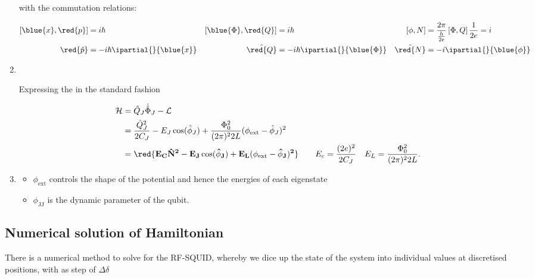 \begin{enumerate}
  \noindent with the commutation relations:

  \begin{align}
    \left[\blue{x},\red{p}\right] & =i\hbar & \left[\blue{\Phi},\red{Q}\right] & = i\hbar & \left[\phi,N\right] & = \frac{2\pi}{\frac{h}{2e}}\left[\Phi,Q\right]\frac{1}{2e} = i\\
    \red{\hat{p}} & = -i\hbar\ipartial{}{\blue{x}} & \hat{\red{Q}} & =-i\hbar\ipartial{}{\blue{\Phi}} & \hat{\red{N}} & =-i\ipartial{}{\blue{\phi}}
  \end{align}

\item\

\begin{framed}\noindent
  Expressing the  in the standard fashion

  \begin{equation}
    \begin{aligned}
      \mathcal{H} & = \hat{Q}_J\dot{\hat{\Phi}}_J - \mathcal{L}\\
      & = \frac{\hat{Q}_J^2}{2C_J} - E_J\cos(\hat{\phi}_J) + \frac{\Phi_0^2}{(2\pi)^22L}(\phi_\text{ext}-\hat{\phi}_J)^2\\
      &    =   \mathbf{\red{E_C{\hat{N}^2}-    E_J\cos(\hat{\phi}_J)   +
          E_L(\phi_\text{ext}-\hat{\phi}_J)^2}}\qquad          E_c          =
      \frac{(2e)^2}{2C_J}\quad E_L = \frac{\Phi_0^2}{(2\pi)^22L}.
    \end{aligned}
  \end{equation}
\end{framed}

\item{}
  \begin{itemize}
  \item $ \phi_{\text{ext}} $ controls the shape of the potential and
    hence the energies of each eigenstate
  \item $ \phi_{\text{JJ}} $ is the dynamic parameter of the qubit.
  \end{itemize}
\end{enumerate}

\newpage
\subsection{Numerical                   solution                   of
  Hamiltonian\label{subsec:flux_numerical}}
There is  a numerical method  to solve  for the RF-SQUID,  whereby we
dice up the state of the system into individual values at discretised
positions, with as step of $ \Delta \delta $

